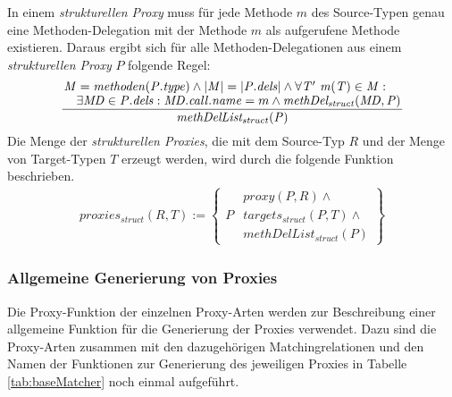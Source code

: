 In einem \emph{strukturellen Proxy} muss für jede Methode $m$ des Source-Typen genau eine Methoden-Delegation mit der Methode $m$ als aufgerufene Methode existieren. Daraus ergibt sich für alle Methoden-Delegationen aus einem \emph{strukturellen Proxy} $P$ folgende Regel:
\begin{gather*}
\frac{\splitfrac{\mathit{M} = \mathit{methoden(P.type)} \wedge |\mathit{M}| = |\mathit{P.dels}| \wedge \forall \mathit{T' \text{ }m(T)} \in \mathit{M}:}{\exists \mathit{MD} \in \mathit{P.dels}:\mathit{MD.call.name} = m \wedge \mathit{methDel_{struct}(MD,P)}
 }
}
{\mathit{methDelList_{struct}(P)}}
\end{gather*}
Die Menge der \emph{strukturellen Proxies}, die mit dem Source-Typ $R$ und der Menge von Target-Typen $T$ erzeugt werden, wird durch die folgende Funktion beschrieben.
\begin{gather*}
\mathit{proxies_{struct}(R,T)} := 
\left\{\begin{array}{l|l}
		& \mathit{proxy(P,R)}\wedge \mathit{ }\\
	P	& \mathit{targets_{struct}(P,T)} \wedge \mathit{ }\\
		& \mathit{methDelList_{struct}(P)}  
		 \end{array}
\right\}
\end{gather*}

\subsubsection{Allgemeine Generierung von Proxies}
Die Proxy-Funktion der einzelnen Proxy-Arten werden zur Beschreibung einer allgemeine Funktion für die Generierung der Proxies verwendet. Dazu sind die Proxy-Arten zusammen mit den dazugehörigen Matchingrelationen und den Namen der Funktionen zur Generierung des jeweiligen Proxies in Tabelle \ref{tab:baseMatcher} noch einmal aufgeführt.


